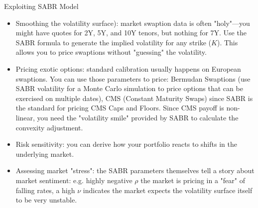 \documentclass{beamer}
\begin{document}
\begin{frame}{Exploiting SABR Model}
\begin{itemize}
\item Smoothing the volatility surface): market swaption data is often "holy"—you might have quotes for 2Y, 5Y, and 10Y tenors, but nothing for 7Y. Use the SABR formula to generate the implied volatility for any strike ($K$). This allows you to price swaptions without "guessing" the volatility.
\item Pricing exotic options: standard calibration usually happens on European swaptions. You can use those parameters to price:
Bermudan Swaptions (use SABR volatility for a Monte Carlo simulation to price options that can be exercised on multiple dates), 
CMS (Constant Maturity Swaps) since SABR is the standard for pricing CMS Caps and Floors. Since CMS payoff is non-linear, you need the "volatility smile" provided by SABR to calculate the convexity adjustment.
\item Risk sensitivity: you can derive how your portfolio reacts to shifts in the underlying market.
\item Assessing market "stress": the SABR parameters themselves tell a story about market sentiment: e.g. highly negative $\rho$ the market is pricing in a "fear" of falling rates, a high $\nu$ indicates the market expects the volatility surface itself to be very unstable.
\end{itemize}
\end{frame}


\end{document}
